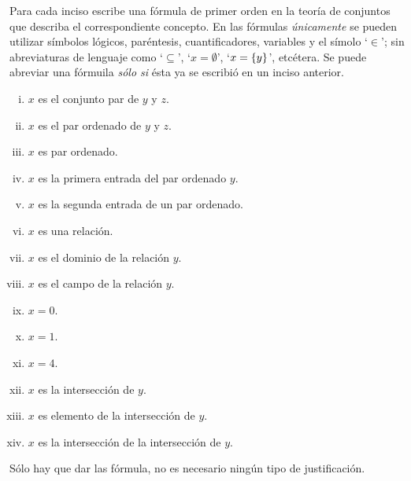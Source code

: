 \begin{exercise}
  Para cada inciso escribe una fórmula de primer orden en la teoría de conjuntos que describa el correspondiente concepto. En las fórmulas \textit{únicamente} se pueden utilizar símbolos lógicos, paréntesis, cuantificadores, variables y el símolo `\(\in\)'; sin abreviaturas de lenguaje como `\(\subseteq\)', `\(x=\emptyset\)', `\(x=\{y\}\)', etcétera. Se puede abreviar una fórmuila \textit{sólo si} ésta ya se escribió en un inciso anterior.
  \begin{multicols}{2}
      \begin{enumerate}[i)]
          \item \(x\) es el conjunto par de \(y\) y \(z\).
          \item \(x\) es el par ordenado de \(y\) y \(z\).
          \item \(x\) es par ordenado.
          \item \(x\) es la primera entrada del par ordenado \(y\).
          \item \(x\) es la segunda entrada de un par ordenado.
          \item \(x\) es una relación.
          \item \(x\) es el dominio de la relación \(y\).
          \item \(x\) es el campo de la relación \(y\).
          \item \(x=0\).
          \item \(x=1\).
          \item \(x=4\).
          \item \(x\) es la intersección de \(y\).
          \item \(x\) es elemento de la intersección de \(y\).
          \item \(x\) es la intersección de la intersección de \(y\).
      \end{enumerate}
  \end{multicols}
  Sólo hay que dar las fórmula, no es necesario ningún tipo de justificación.
\end{exercise}


